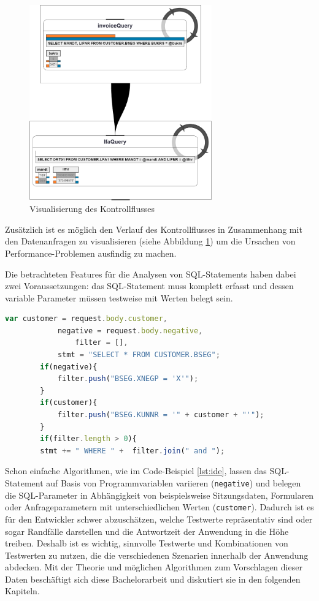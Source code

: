 \begin{figure}[ht]
	\centering
  \includegraphics[width=0.7\textwidth]{figures/feedback.png}
	\caption{Visualisierung des Kontrollflusses}
	\label{fig:feedback}
\end{figure}

Zusätzlich ist es möglich den Verlauf des Kontrollflusses in Zusammenhang mit den Datenanfragen zu visualisieren \cite{Frahnow2014} (siehe Abbildung \ref{fig:feedback}) um die Ursachen von Performance-Problemen ausfindig zu machen.

Die betrachteten Features für die Analysen von SQL-Statements haben dabei zwei Voraussetzungen: das SQL-Statement muss komplett erfasst und dessen variable Parameter müssen testweise mit Werten belegt sein.

\begin{lstlisting}[caption={Variablen nehmen Einfluss auf die SQL-Query und -Parameter}, label={lst:ide}, language=JavaScript]
		var customer = request.body.customer,
		    negative = request.body.negative,
				filter = [],
		    stmt = "SELECT * FROM CUSTOMER.BSEG";
		if(negative){
			filter.push("BSEG.XNEGP = 'X'");
		}
		if(customer){
			filter.push("BSEG.KUNNR = '" + customer + "'");
		}
		if(filter.length > 0){
		stmt += " WHERE " +  filter.join(" and ");
\end{lstlisting}

Schon einfache Algorithmen, wie im Code-Beispiel \ref{lst:ide}, lassen das SQL-Statement auf Basis von Programmvariablen variieren (\texttt{negative}) und belegen die SQL-Parameter in Abhängigkeit von beispielsweise Sitzungsdaten, Formularen oder Anfrageparametern mit unterschiedlichen Werten (\texttt{customer}).
Dadurch ist es für den Entwickler schwer abzuschätzen, welche Testwerte repräsentativ sind oder sogar Randfälle darstellen und die Antwortzeit der Anwendung in die Höhe treiben.
Deshalb ist es wichtig, sinnvolle Testwerte und Kombinationen von Testwerten zu nutzen, die die verschiedenen Szenarien innerhalb der Anwendung abdecken.
Mit der Theorie und möglichen Algorithmen zum Vorschlagen dieser Daten beschäftigt sich diese Bachelorarbeit und diskutiert sie in den folgenden Kapiteln.
